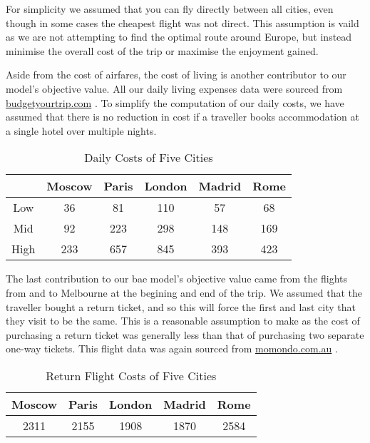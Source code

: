 \documentclass[12pt]{article}
\begin{document}
For simplicity we assumed that you can fly directly between all cities, even though in some cases the cheapest flight was not direct. This assumption is vaild as we are not attempting to find the optimal route around Europe, but instead minimise the overall cost of the trip or maximise the enjoyment gained. 

Aside from the cost of airfares, the cost of living is another contributor to our model's objective value. All our daily living expenses data were sourced from \url{budgetyourtrip.com} \cite{budget}. To simplify the computation of our daily costs, we have assumed that there is no reduction in cost if a traveller books accommodation at a single hotel over multiple nights.

\begin{table}[h]
\caption{Daily Costs of Five Cities}
\centering
\vspace{1mm}
\begin{tabular}{c|c|c|c|c|c}
\hline
\rule{0pt}{2ex}  & Moscow & Paris & London & Madrid & Rome \\
\hline
\rule{0pt}{2ex}Low & 36 & 81 & 110 & 57 & 68 \\
Mid & 92 & 223 & 298 & 148 & 169 \\
High & 233 & 657 & 845 & 393 & 423 \\

\end{tabular}
\end{table}

The last contribution to our bae model's objective value came from the flights from and to Melbourne at the begining and end of the trip. We assumed that the traveller bought a return ticket, and so this will force the first and last city that they visit to be the same. This is a reasonable assumption to make as the cost of purchasing a return ticket was generally less than that of purchasing two separate one-way tickets.  This flight data was again sourced from \url{momondo.com.au} \cite{momondo}.

\begin{table}[h]
\caption{Return Flight Costs of Five Cities}
\centering
\vspace{1mm}
\begin{tabular}{c|c|c|c|c}
\hline
\rule{0pt}{2ex} Moscow & Paris & London & Madrid & Rome \\
\hline
\rule{0pt}{2ex} 2311 & 2155 & 1908 & 1870 & 2584 \\

\end{tabular}
\end{table}
\end{document}
